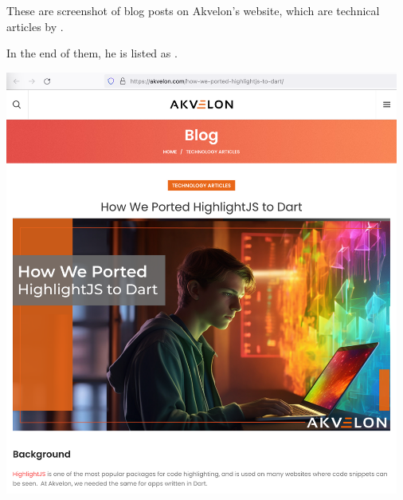 
These are screenshot of blog posts on Akvelon's website,
which are technical articles by \mrl.

In the end of them, he is listed as .

\begin{center}
    \includegraphics[width=35em]{ported-p1}
\end{center}
\pagebreak

